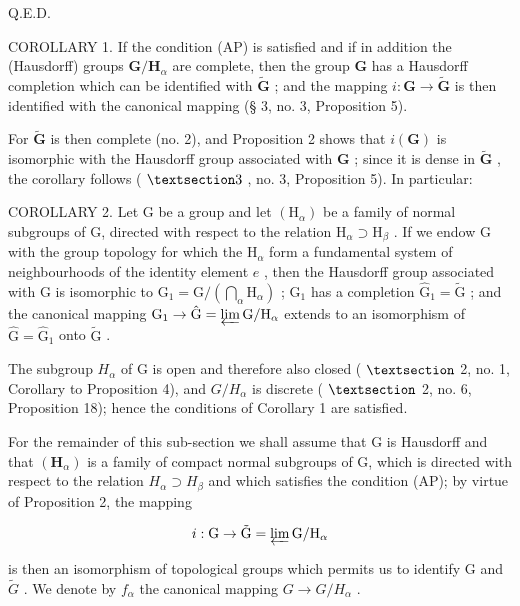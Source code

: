 Q.E.D.

COROLLARY 1. If the condition (AP) is satisfied and if in addition the (Hausdorff) groups \(\mathbf{G} / \mathbf{H}_{\alpha}\) are complete, then the group \(\mathbf{G}\) has a Hausdorff completion which can be identified with \(\tilde{\mathbf{G}}\) ; and the mapping \(i: \mathbf{G} \to \tilde{\mathbf{G}}\) is then identified with the canonical mapping (§ 3, no. 3, Proposition 5).

For \(\tilde{\mathbf{G}}\) is then complete (no. 2), and Proposition 2 shows that \(i(\mathbf{G})\) is isomorphic with the Hausdorff group associated with \(\mathbf{G}\) ; since it is dense in \(\tilde{\mathbf{G}}\) , the corollary follows ( \(\S 3\) , no. 3, Proposition 5). In particular:

COROLLARY 2. Let G be a group and let \((\mathrm{H}_{\alpha})\) be a family of normal subgroups of G, directed with respect to the relation \(\mathrm{H}_{\alpha} \supset \mathrm{H}_{\beta}\) . If we endow G with the group topology for which the \(\mathrm{H}_{\alpha}\) form a fundamental system of neighbourhoods of the identity element \(e\) , then the Hausdorff group associated with G is isomorphic to \(\mathrm{G}_{1} = \mathrm{G} / \left( \bigcap_{\alpha} \mathrm{H}_{\alpha} \right)\) ; \(\mathrm{G}_{1}\) has a completion \(\hat{\mathrm{G}}_{1} = \tilde{\mathrm{G}}\) ; and the canonical mapping \(\mathrm{G}_{1} \to \hat{\mathrm{G}} = \varprojlim \mathrm{G} / \mathrm{H}_{\alpha}\) extends to an isomorphism of \(\hat{\mathrm{G}} = \hat{\mathrm{G}}_{1}\) onto \(\tilde{\mathrm{G}}\) .

The subgroup \(H_{\alpha}\) of G is open and therefore also closed ( \(\S\) 2, no. 1, Corollary to Proposition 4), and \(G/H_{\alpha}\) is discrete ( \(\S\) 2, no. 6, Proposition 18); hence the conditions of Corollary 1 are satisfied.

For the remainder of this sub-section we shall assume that G is Hausdorff and that \((\mathbf{H}_{\alpha})\) is a family of compact normal subgroups of G, which is directed with respect to the relation \(H_{\alpha} \supset H_{\beta}\) and which satisfies the condition (AP); by virtue of Proposition 2, the mapping

\[
i: \mathrm{G} \rightarrow \tilde {\mathrm{G}} = \varprojlim \mathrm{G} / \mathrm{H} _ {\alpha}
\]

is then an isomorphism of topological groups which permits us to identify G and \(\tilde{G}\) . We denote by \(f_{\alpha}\) the canonical mapping \(G \rightarrow G/H_{\alpha}\) .

